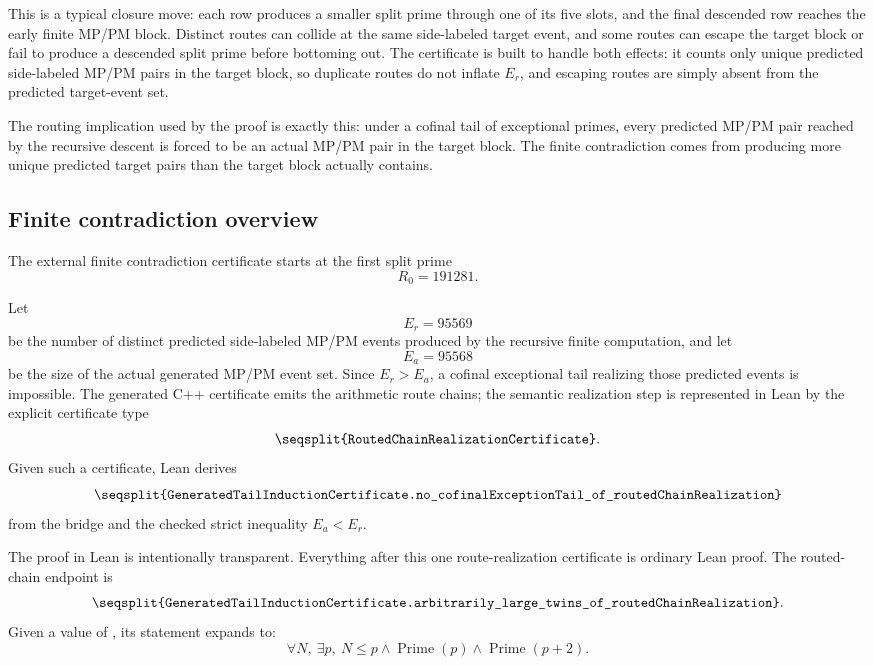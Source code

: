 \documentclass[11pt]{article}
\newcommand{\Prime}{\operatorname{Prime}}
\newcommand{\Lean}[1]{\texttt{\seqsplit{#1}}}
\begin{document}
This is a typical closure move: each row produces a smaller split prime through
one of its five slots, and the final descended row reaches the early finite
MP/PM block.  Distinct routes can collide at the same side-labeled target
event, and some routes can escape the target block or fail to produce a
descended split prime before bottoming out.  The certificate is built to handle
both effects: it counts only unique predicted side-labeled MP/PM pairs in the
target block, so duplicate routes do not inflate \(E_r\), and escaping routes
are simply absent from the predicted target-event set.

The routing implication used by the proof is exactly this: under a cofinal
tail of exceptional primes, every predicted MP/PM pair reached by the recursive
descent is forced to be an actual MP/PM pair in the target block.  The finite
contradiction comes from producing more unique predicted target pairs than the
target block actually contains.

\subsection{Finite contradiction overview}

The external finite contradiction certificate starts at the first split prime
\[
  R_0=191281.
\]

Let
\[
  E_r=95569
\]
be the number of distinct predicted side-labeled MP/PM events produced by the
recursive finite computation, and let
\[
  E_a=95568
\]
be the size of the actual generated MP/PM event set.  Since \(E_r>E_a\), a
cofinal exceptional tail realizing those predicted events is impossible.  The
generated C++ certificate emits the arithmetic route chains; the semantic
realization step is represented in Lean by the explicit certificate type
\[
  \Lean{RoutedChainRealizationCertificate}.
\]
Given such a certificate, Lean derives
\[
  \Lean{GeneratedTailInductionCertificate.no\_cofinalExceptionTail\_of\_routedChainRealization}
\]
from the bridge and the checked strict inequality \(E_a<E_r\).

The proof in Lean is intentionally transparent.  Everything after this one
route-realization certificate is ordinary Lean proof.  The routed-chain endpoint is
\[
  \Lean{GeneratedTailInductionCertificate.arbitrarily\_large\_twins\_of\_routedChainRealization}.
\]
Given a value of \Lean{RoutedChainRealizationCertificate}, its statement expands to:
\[
  \forall N,\ \exists p,\ N\le p\wedge\Prime(p)\wedge\Prime(p+2).
\]
\end{document}
